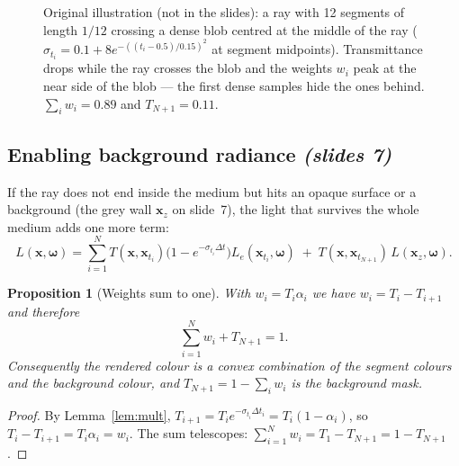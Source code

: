 \documentclass[11pt,a4paper]{article}
\newcommand{\sref}[1]{\texorpdfstring{\emph{(slides #1)}}{(slides #1)}}
\newcommand{\om}{\boldsymbol{\omega}}
\newcommand{\xx}{\boldsymbol{x}}
\newcommand{\Le}{L_e}
\theoremstyle{definition}
\theoremstyle{plain}
\newtheorem{proposition}[definition]{Proposition}
\theoremstyle{remark}
\begin{document}
\begin{figure}[H]
\centering
{}
\caption{Original illustration (not in the slides): a ray with 12 segments of length $1/12$ crossing a dense blob centred at the middle of the ray ($\sigma_{t_i}=0.1+8e^{-((t_i-0.5)/0.15)^2}$ at segment midpoints). Transmittance drops while the ray crosses the blob and the weights $w_i$ peak at the near side of the blob --- the first dense samples hide the ones behind. $\sum_iw_i=0.89$ and $T_{N+1}=0.11$.}
\end{figure}

\subsection{Enabling background radiance \sref{7}}

If the ray does not end inside the medium but hits an opaque surface or a background (the grey wall $\xx_z$ on slide~7), the light that survives the whole medium adds one more term:
\[
L(\xx,\om)=\sum_{i=1}^{N}T(\xx,\xx_{t_i})\big(1-e^{-\sigma_{t_i}\Delta t}\big)\Le(\xx_{t_i},\om)\;+\;T(\xx,\xx_{t_{N+1}})\,L(\xx_z,\om).
\]

\begin{proposition}[Weights sum to one]\label{prop:sum1}
With $w_i=T_i\alpha_i$ we have $w_i=T_i-T_{i+1}$ and therefore
\[
\sum_{i=1}^{N}w_i+T_{N+1}=1 .
\]
Consequently the rendered colour is a \emph{convex combination} of the segment colours and the background colour, and $T_{N+1}=1-\sum_iw_i$ is the \emph{background mask}.
\end{proposition}
\begin{proof}
By Lemma~\ref{lem:mult}, $T_{i+1}=T_ie^{-\sigma_{t_i}\Delta t_i}=T_i(1-\alpha_i)$, so $T_i-T_{i+1}=T_i\alpha_i=w_i$. The sum telescopes: $\sum_{i=1}^Nw_i=T_1-T_{N+1}=1-T_{N+1}$.
\end{proof}
\end{document}
